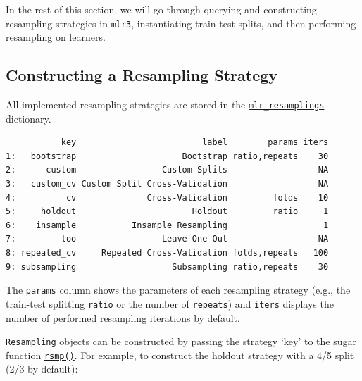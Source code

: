 In the rest of this section, we will go through querying and
constructing resampling strategies in \texttt{mlr3}, instantiating
train-test splits, and then performing resampling on learners.

\hypertarget{sec-resampling-construct}{%
\subsection{Constructing a Resampling
Strategy}\label{sec-resampling-construct}}

All implemented resampling strategies are stored in the
\href{https://mlr3.mlr-org.com/reference/mlr_resamplings.html}{\texttt{mlr\_resamplings}}
dictionary.

\begin{Shaded}
\begin{Highlighting}[]
\end{Highlighting}
\end{Shaded}

\begin{verbatim}
           key                         label        params iters
1:   bootstrap                     Bootstrap ratio,repeats    30
2:      custom                 Custom Splits                  NA
3:   custom_cv Custom Split Cross-Validation                  NA
4:          cv              Cross-Validation         folds    10
5:     holdout                       Holdout         ratio     1
6:    insample           Insample Resampling                   1
7:         loo                 Leave-One-Out                  NA
8: repeated_cv     Repeated Cross-Validation folds,repeats   100
9: subsampling                   Subsampling ratio,repeats    30
\end{verbatim}

The \texttt{params} column shows the parameters of each resampling
strategy (e.g., the train-test splitting \texttt{ratio} or the number of
\texttt{repeats}) and \texttt{iters} displays the number of performed
resampling iterations by default.

\href{https://mlr3.mlr-org.com/reference/Resampling.html}{\texttt{Resampling}}
objects can be constructed by passing the strategy `key' to the sugar
function
\href{https://mlr3.mlr-org.com/reference/mlr_sugar.html}{\texttt{rsmp()}}.
For example, to construct the holdout strategy with a 4/5 split (2/3 by
default):

